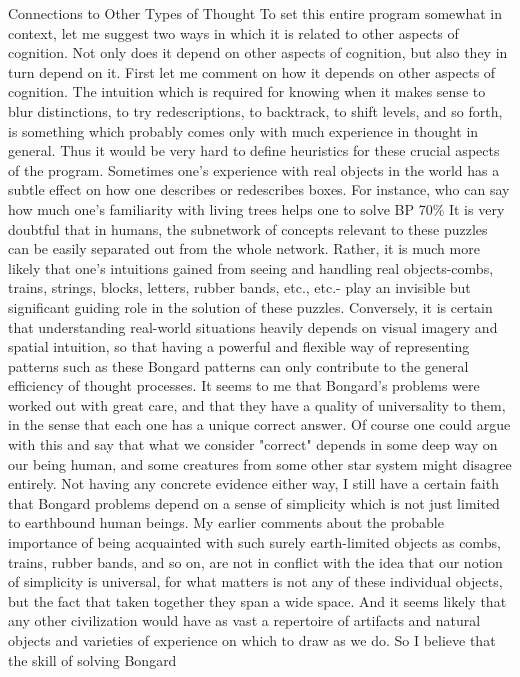                    Connections to Other Types of Thought
To set this entire program somewhat in context, let me suggest two ways in which it is
related to other aspects of cognition. Not only does it depend on other aspects of
cognition, but also they in turn depend on it. First let me comment on how it depends on
other aspects of cognition. The intuition which is required for knowing when it makes
sense to blur distinctions, to try redescriptions, to backtrack, to shift levels, and so forth,
is something which probably comes only with much experience in thought in general.
Thus it would be very hard to define heuristics for these crucial aspects of the program.
Sometimes one's experience with real objects in the world has a subtle effect on how one
describes or redescribes boxes. For instance, who can say how much one's familiarity
with living trees helps one to solve BP 70\% It is very doubtful that in humans, the
subnetwork of concepts relevant to these puzzles can be easily separated out from the
whole network. Rather, it is much more likely that one's intuitions gained from seeing
and handling real objects-combs, trains, strings, blocks, letters, rubber bands, etc., etc.-
play an invisible but significant guiding role in the solution of these puzzles.
        Conversely, it is certain that understanding real-world situations heavily depends
on visual imagery and spatial intuition, so that having a powerful and flexible way of
representing patterns such as these Bongard patterns can only contribute to the general
efficiency of thought processes.
It seems to me that Bongard's problems were worked out with great care, and that they
have a quality of universality to them, in the sense that each one has a unique correct
answer. Of course one could argue with this and say that what we consider "correct"
depends in some deep way on our being human, and some creatures from some other star
system might disagree entirely. Not having any concrete evidence either way, I still have
a certain faith that Bongard problems depend on a sense of simplicity which is not just
limited to earthbound human beings. My earlier comments about the probable importance
of being acquainted with such surely earth-limited objects as combs, trains, rubber bands,
and so on, are not in conflict with the idea that our notion of simplicity is universal, for
what matters is not any of these individual objects, but the fact that taken together they
span a wide space. And it seems likely that any other civilization would have as vast a
repertoire of artifacts and natural objects and varieties of experience on which to draw as
we do. So I believe that the skill of solving Bongard




